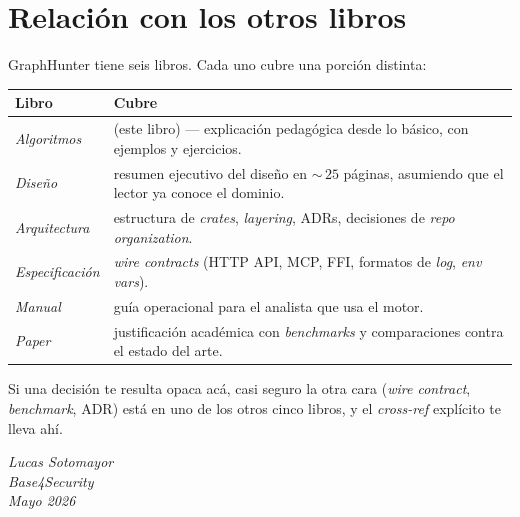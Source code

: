 \section*{Relación con los otros libros}

GraphHunter tiene seis libros. Cada uno cubre una porción distinta:

\begin{center}
\renewcommand{\arraystretch}{1.2}
\begin{tabular}{p{2.4cm}p{10.5cm}}
\toprule
\textbf{Libro} & \textbf{Cubre} \\
\midrule
\emph{Algoritmos} & (este libro) — explicación pedagógica desde lo básico, con ejemplos y ejercicios. \\
\emph{Diseño} & resumen ejecutivo del diseño en \(\sim\,25\) páginas, asumiendo que el lector ya conoce el dominio. \\
\emph{Arquitectura} & estructura de \emph{crates}, \emph{layering}, ADRs, decisiones de \emph{repo organization}. \\
\emph{Especificación} & \emph{wire contracts} (HTTP API, MCP, FFI, formatos de \emph{log}, \emph{env vars}). \\
\emph{Manual} & guía operacional para el analista que usa el motor. \\
\emph{Paper} & justificación académica con \emph{benchmarks} y comparaciones contra el estado del arte. \\
\bottomrule
\end{tabular}
\end{center}

Si una decisión te resulta opaca acá, casi seguro la otra cara
(\emph{wire contract}, \emph{benchmark}, ADR) está en uno de los otros
cinco libros, y el \emph{cross-ref} explícito te lleva ahí.

\vspace{1em}
\begin{flushright}
\textit{Lucas Sotomayor}\\
\textit{Base4Security}\\
\textit{Mayo 2026}
\end{flushright}

\cleardoublepage
